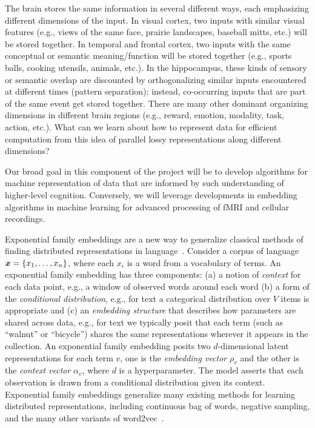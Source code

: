 \let\tilde\widetilde
\def\SS{{\mathbb S}}
\def\X{{\mathbb X}}
\def\bb{b}
\def\noisesd{\sigma}
\def\C{{\mathcal C}}
\def\A{{\mathcal A}}
\def\bigbracket#1#2#3{
\left[ 
\mbox{\begin{minipage}{#1}{
\vskip#2
#3
\vskip#2
\mbox{\ }
}\end{minipage}}
\right]
}

\label{sec:aim2}

The brain stores the same information in several different ways, each
emphasizing different dimensions of the input. In visual cortex, two
inputs with similar visual features (e.g., views of the same face,
prairie landscapes, baseball mitts, etc.) will be stored together. In
temporal and frontal cortex, two inputs with the same conceptual or
semantic meaning/function will be stored together (e.g., sports balls,
cooking utensils, animals, etc.). In the hippocampus, these kinds of
sensory or semantic overlap are discounted by orthogonalizing similar
inputs encountered at different times (pattern separation); instead,
co-occurring inputs that are part of the same event get stored
together. There are many other dominant organizing dimensions in
different brain regions (e.g., reward, emotion, modality, task, action,
etc.). What can we learn about
how to represent data for efficient computation from this idea of parallel lossy
representations along different dimensions?

Our broad goal in this component of the project will be to develop algorithms
for machine representation of data that are informed by such
understanding of higher-level cognition. Conversely, we
will leverage developments in embedding algorithms in 
machine learning for advanced processing of fMRI and cellular
recordings.

\biobackground{}

\statbackground{}
Exponential family embeddings are a new way to
generalize classical methods of finding distributed representations in
language~\citep{Rudolph:2016b}.
Consider a corpus of language $\boldsymbol{x} = \{x_1, \ldots, x_n\}$, where
each $x_i$ is a word from a vocabulary of terms. An exponential family
embedding has three components: (a) a notion of \textit{context} for
each data point, e.g., a window of observed words around each word (b)
a form of the \textit{conditional distribution}, e.g., for text a
categorical distribution over $V$ items is appropriate and (c) an
\textit{embedding structure} that describes how parameters are shared
across data, e.g., for text we typically posit that each term (such as
``walnut'' or ``bicycle'') shares the same representations wherever it
appears in the collection.
An exponential family embedding
posits two $d$-dimensional latent representations for each term $v$,
one is the \textit{embedding vector} $\rho_v$ and the other is the
\textit{context vector} $\alpha_v$, where $d$ is a hyperparameter.  The
model asserts that each observation is drawn from a conditional
distribution given its context. 
Exponential family embeddings generalize many existing methods for
learning distributed representations, including continuous bag of
words, negative sampling, and the many other variants of
word2vec~\citep{Bengio:2003,Mikolov:2013}.  

